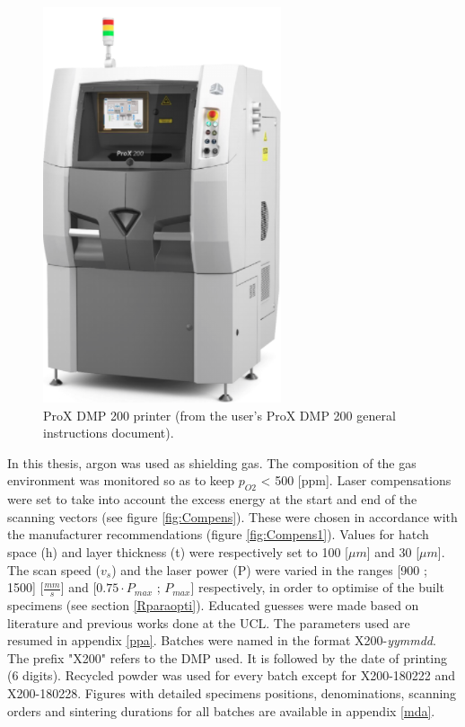 \begin{figure}[ht]
\centering
\includegraphics[scale=0.7]{Images/Printer}
\decoRule
\caption[ProX DMP 200 printer]{ProX DMP 200 printer (from the user's ProX DMP 200 general instructions document).}
\label{fig:Printer}
\end{figure}

In this thesis, argon was used as shielding gas. The composition of the gas environment was monitored so as to keep $p_{O2}$ < 500 [ppm]. Laser compensations were set to take into account the excess energy at the start and end of the scanning vectors (see figure \ref{fig:Compens}). These were chosen in accordance with the manufacturer recommendations (figure \ref{fig:Compens1}). Values for hatch space (h) and layer thickness (t) were respectively set to 100 [$\mu m$] and 30 [$\mu m$]. The scan speed ($v_s$) and the laser power (P) were varied in the ranges [900 ; 1500] [$\frac{mm}{s}$] and [$0.75 \cdot P_{max}$ ; $P_{max}$] respectively, in order to optimise of the built specimens (see section \ref{Rparaopti}). Educated guesses were made based on literature and previous works done at the UCL. The parameters used are resumed in appendix \ref{ppa}. Batches were named in the format X200-\textit{yymmdd}. The prefix "X200" refers to the DMP used. It is followed by the date of printing (6 digits). Recycled powder was used for every batch except for X200-180222 and X200-180228. Figures with detailed specimens positions, denominations, scanning orders and sintering durations for all batches are available in appendix \ref{mda}.\\


